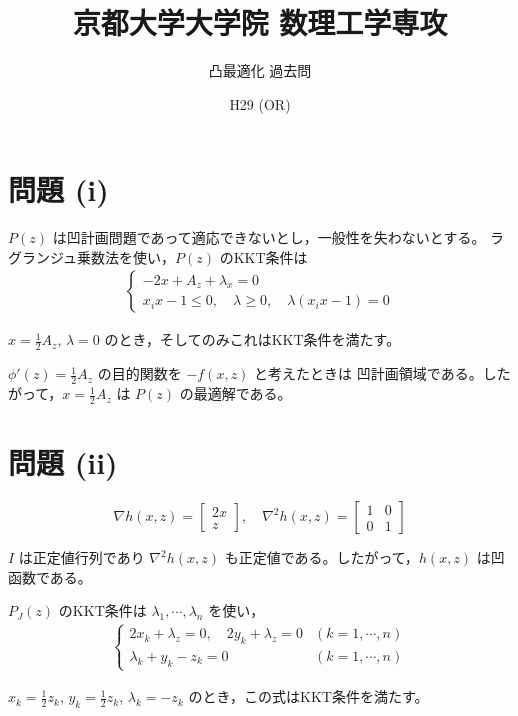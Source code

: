 \documentclass[12pt,a4paper]{article}
\title{京都大学大学院 数理工学専攻}
\author{凸最適化 過去問}
\date{H29 (OR)}
\begin{document}
\maketitle

\section*{問題 (i)}

$P(z)$ は凹計画問題であって適応できないとし，一般性を失わないとする。
ラグランジュ乗数法を使い，$P(z)$ のKKT条件は
\begin{align}
\begin{cases}
-2x + A_z + \lambda_x = 0 \\
x_i x - 1 \leq 0, \quad \lambda \geq 0, \quad \lambda(x_i x - 1) = 0
\end{cases}
\end{align}

$x = \frac{1}{2}A_z$, $\lambda = 0$ のとき，そしてのみこれはKKT条件を満たす。

$\phi'(z) = \frac{1}{2}A_z$ の目的関数を $-f(x,z)$ と考えたときは
凹計画領域である。したがって，$x = \frac{1}{2}A_z$ は $P(z)$ の最適解である。

\section*{問題 (ii)}

\[\nabla h(x,z) = \begin{bmatrix} 2x \\ z \end{bmatrix}, \quad \nabla^2 h(x,z) = \begin{bmatrix} 1 & 0 \\ 0 & 1 \end{bmatrix}\]

$I$ は正定値行列であり $\nabla^2 h(x,z)$ も正定値である。したがって，$h(x,z)$ は凹函数である。

$P_J(z)$ のKKT条件は $\lambda_1, \cdots, \lambda_n$ を使い，
\begin{align}
\begin{cases}
2x_k + \lambda_z = 0, \quad 2y_k + \lambda_z = 0 & (k = 1, \cdots, n) \\
\lambda_k + y_k - z_k = 0 & (k = 1, \cdots, n)
\end{cases}
\end{align}

$x_k = \frac{1}{2}z_k$, $y_k = \frac{1}{2}z_k$, $\lambda_k = -z_k$ のとき，この式はKKT条件を満たす。
\end{document}

